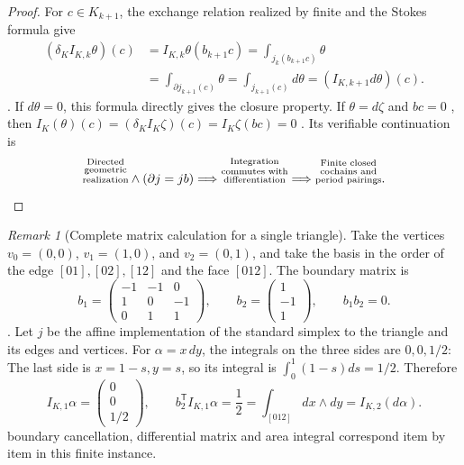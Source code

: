 \documentclass[12pt,a4paper,openany,notitlepage]{report}
\theoremstyle{plain}
\theoremstyle{definition}
\theoremstyle{remark}
\newtheorem{remark}[theorem]{Remark}
\begin{document}
\begin{CJK*}
\begin{proof}
For $c\in K_{k+1}$, the exchange relation realized by finite and the Stokes formula give \[
\begin{aligned}
(\delta_K I_{K,k}\theta)(c)
&=I_{K,k}\theta(b_{k+1}c)
=\int_{j_k(b_{k+1}c)}\theta\\
&=\int_{\partial j_{k+1}(c)}\theta
=\int_{j_{k+1}(c)}d\theta
=(I_{K,k+1}d\theta)(c).
\end{aligned}
\]. If $d\theta=0$, this formula directly gives the closure property. If $\theta=d\zeta$ and $b c=0$ , then $I_K(\theta)(c)=(\delta_KI_K\zeta)(c)=I_K\zeta(bc)=0$ . Its verifiable continuation is \[
\text{\shortstack[c]{\scriptsize Directed\\[-1pt]\scriptsize geometric\\[-1pt]\scriptsize realization}}\land(\partial j=jb)
\Longrightarrow\text{\shortstack[c]{\scriptsize Integration\\[-1pt]\scriptsize commutes with\\[-1pt]\scriptsize differentiation}}
\Longrightarrow\text{\shortstack[c]{\scriptsize Finite closed\\[-1pt]\scriptsize cochains and\\[-1pt]\scriptsize period pairings}}.
\]\end{proof}


\begin{remark}
[Complete matrix calculation for a single triangle]Take the vertices $v_0=(0,0)$, $v_1=(1,0)$, and $v_2=(0,1)$, and take the basis in the order of the edge $[01],[02],[12]$ and the face $[012]$. The boundary matrix is \[
b_1=\begin{pmatrix}-1&-1&0\\1&0&-1\\0&1&1\end{pmatrix},
\qquad b_2=\begin{pmatrix}1\\-1\\1\end{pmatrix},
\qquad b_1b_2=0.
\]. Let $j$ be the affine implementation of the standard simplex to the triangle and its edges and vertices. For $\alpha=x\,dy$, the integrals on the three sides are $0,0,1/2$: The last side is $x=1-s,y=s$, so its integral is $\int_0^1(1-s)ds=1/2$. Therefore \[
I_{K,1}\alpha=\begin{pmatrix}0\\0\\1/2\end{pmatrix},
\qquad
b_2^{\mathsf T}I_{K,1}\alpha=\frac12
=\int_{[012]}dx\wedge dy=I_{K,2}(d\alpha).
\] boundary cancellation, differential matrix and area integral correspond item by item in this finite instance.\end{remark}



\end{CJK*}
\end{document}
